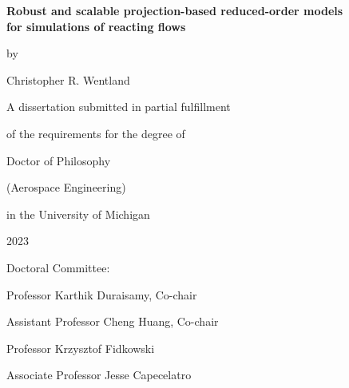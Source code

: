 \thispagestyle{empty}

\begin{singlespace}
\begin{center}

	\textbf{Robust and scalable projection-based reduced-order models \\for simulations of reacting flows}

	\vspace{2em}

	by

	\vspace{2em}

    Christopher R. Wentland

	\vspace{6em}

	A dissertation submitted in partial fulfillment

	of the requirements for the degree of

	Doctor of Philosophy

	(Aerospace Engineering)

	in the University of Michigan

	2023

\end{center}

\vspace{8em}

Doctoral Committee:

\vspace{1em}

\hspace{3em}Professor Karthik Duraisamy, Co-chair

\hspace{3em}Assistant Professor Cheng Huang, Co-chair

\hspace{3em}Professor Krzysztof Fidkowski

\hspace{3em}Associate Professor Jesse Capecelatro

\end{singlespace}
\restoregeometry